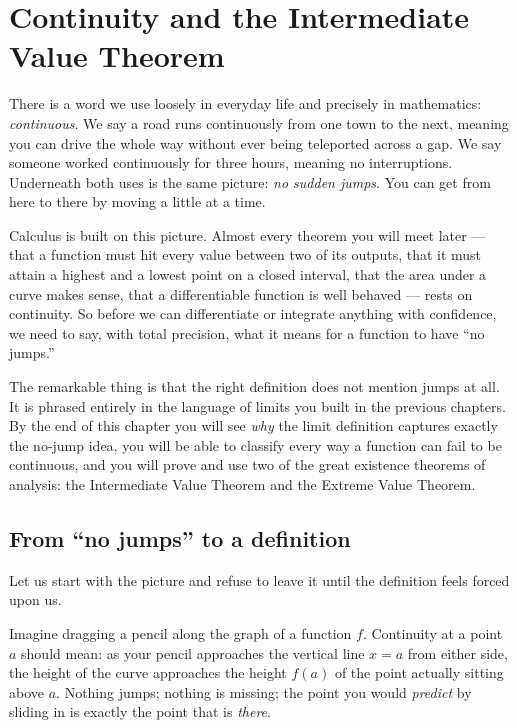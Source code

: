 \chapter{Continuity and the Intermediate Value Theorem}

There is a word we use loosely in everyday life and precisely in mathematics:
\emph{continuous}. We say a road runs continuously from one town to the next, meaning
you can drive the whole way without ever being teleported across a gap. We say someone
worked continuously for three hours, meaning no interruptions. Underneath both uses is
the same picture: \emph{no sudden jumps}. You can get from here to there by moving a
little at a time.

Calculus is built on this picture. Almost every theorem you will meet later --- that a
function must hit every value between two of its outputs, that it must attain a highest
and a lowest point on a closed interval, that the area under a curve makes sense, that a
differentiable function is well behaved --- rests on continuity. So before we can
differentiate or integrate anything with confidence, we need to say, with total
precision, what it means for a function to have ``no jumps.''

The remarkable thing is that the right definition does not mention jumps at all. It is
phrased entirely in the language of limits you built in the previous chapters. By the end
of this chapter you will see \emph{why} the limit definition captures exactly the
no-jump idea, you will be able to classify every way a function can fail to be
continuous, and you will prove and use two of the great existence theorems of analysis:
the Intermediate Value Theorem and the Extreme Value Theorem.

\section{From ``no jumps'' to a definition}
\label{ch08:no-jumps}

Let us start with the picture and refuse to leave it until the definition feels forced
upon us.

Imagine dragging a pencil along the graph of a function $f$. Continuity at a point $a$
should mean: as your pencil approaches the vertical line $x=a$ from either side, the
height of the curve approaches the height $f(a)$ of the point actually sitting above $a$.
Nothing jumps; nothing is missing; the point you would \emph{predict} by sliding in is
exactly the point that is \emph{there}.

